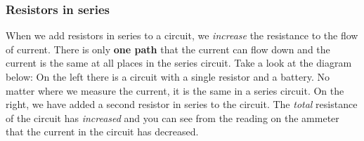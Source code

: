 \subsubsection{Resistors in series}
When we add resistors in series to a circuit, we \textit{increase} the resistance to the flow of current. There is only \textbf{one path} that the current can flow down and the current is the same at all places in the series circuit. Take a look at the diagram below: On the left there is a circuit with a single resistor and a battery. No matter where we measure the current, it is the same in a series circuit. On the right, we have added a second resistor in series to the circuit. The \textit{total} resistance of the circuit has \textit{increased} and you can see from the reading on the ammeter that the current in the circuit has decreased.


